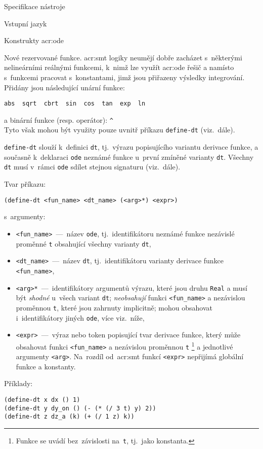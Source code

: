 \documentclass[thesis=M,czech]{FITthesis}[2012/06/26]
\newcommand{\acrlabel}[1]{acr:#1}
\newcommand{\acr}[1]{\acrshort{\acrlabel{#1}}}
\newcommand{\id}[1]{\texttt{#1}}
\newcommand{\hl}[1]{\textit{#1}}
\begin{document}
\begin{section}{Specifikace nástroje}
\begin{subsection}{Vstupní jazyk}
\begin{subsubsection}{Konstrukty \acr{ode}}
\begin{paragraph}{Nové rezervované funkce.}
\label{p:design:spec:ilang:ode:reserved}
\acr{smt} logiky neumějí dobře zacházet s~některými
nelineárními reálnými funkcemi,
k~nimž lze využít \acr{ode} řešič
a namísto s~funkcemi pracovat s~konstantami,
jimž jsou přiřazeny výsledky integrování.
Přidány jsou následující unární funkce:
\begin{center}
\id{abs \  sqrt \  cbrt \  sin \  cos \  tan \  exp \  ln}
\end{center}
a binární funkce (resp. operátor): \quad \id{\^{}} \\
Tyto však mohou být využity pouze uvnitř příkazu \id{define\--dt}
(viz.~dále).
\end{paragraph} %


\begin{paragraph}{\id{define-dt}}\label{p:design:spec:ilang:ode:dt}
slouží k~definici \id{dt}, tj.~výrazu popisujícího variantu derivace funkce,
a současně k~deklaraci \id{ode} neznámé funkce
u~první zmíněné varianty \id{dt}.
Všechny \id{dt} musí v~rámci \id{ode}
sdílet stejnou signaturu (viz.~dále).

Tvar příkazu:
\begin{center}
\id{(define-dt <fun\_\-name> <dt\_\-name> (<arg>*) <expr>)}
\end{center}
s~argumenty:
\begin{itemize}
\item \id{<fun\_\-name>}~---~název \id{ode},
   tj.~identifikátoru neznámé funkce nezávislé
   proměnné \id{t} obsahující všechny varianty \id{dt},
\item \id{<dt\_\-name>}~---~název \id{dt},
   tj.~identifikátoru varianty derivace funkce \id{<fun\_\-name>},
\item \id{<arg>*}~---~identifikátory argumentů výrazu,
   které jsou druhu \id{Real} a musí být
   \hl{shodné} u~všech variant \id{dt};
   \hl{neobsahují} funkci \id{<fun\_\-name>}
   a nezávislou proměnnou \id{t},
   které jsou zahrnuty implicitně;
   mohou obsahovat i~identifikátory jiných \id{ode},
   více viz.~níže,
\item \id{<expr>}~---~výraz nebo token popisující tvar derivace funkce,
   který může obsahovat funkci \id{<fun\_\-name>}
   a nezávislou proměnnou \id{t}\:%
   \footnote{Funkce se uvádí bez~závislosti na~\id{t},
   tj.~jako konstanta.}
   a jednotlivé argumenty \id{<arg>}.
   Na~rozdíl od~\acr{smt} funkcí
   \id{<expr>} nepřijímá globální funkce a konstanty.
\end{itemize}
Příklady:
\begin{center}
\id{(define-dt x dx () 1)}\\
\id{(define-dt y dy\_\-on () (- (* (/ 3 t) y) 2))}\\
\id{(define-dt z dz\_\-a (k) (+ (/ 1 z) k))}
\end{center}


\end{paragraph}
\end{subsubsection}
\end{subsection}
\end{section}
\end{document}
